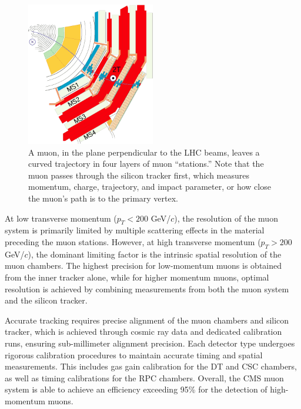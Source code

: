 \begin{figure}[!hbt]
\centering
\includegraphics[width=0.50\textwidth]{figures/MuStations.png}
\caption{A muon, in the plane perpendicular to the LHC beams, leaves a curved trajectory in four layers of  muon ``stations.'' Note that the muon passes through the silicon tracker first, which measures momentum, charge, trajectory, and impact parameter, or how close the muon's path is to the primary vertex.}
\label{fig:MuStations}
\end{figure}    

At low transverse momentum (\( p_T < 200 \) GeV/\( c \)), the resolution of the muon system is primarily limited by multiple scattering effects in the material preceding the muon stations. However, at high transverse momentum (\( p_T > 200 \) GeV/\( c \)), the dominant limiting factor is the intrinsic spatial resolution of the muon chambers. The highest precision for low-momentum muons is obtained from the inner tracker alone, while for higher momentum muons, optimal resolution is achieved by combining measurements from both the muon system and the silicon tracker.

Accurate tracking requires precise alignment of the muon chambers and silicon tracker, which is achieved through cosmic ray data and dedicated calibration runs, ensuring sub-millimeter alignment precision. Each detector type undergoes rigorous calibration procedures to maintain accurate timing and spatial measurements. This includes gas gain calibration for the DT and CSC chambers, as well as timing calibrations for the RPC chambers. Overall, the CMS muon system is able to achieve an efficiency exceeding 95\% for the detection of high-momentum muons. 





